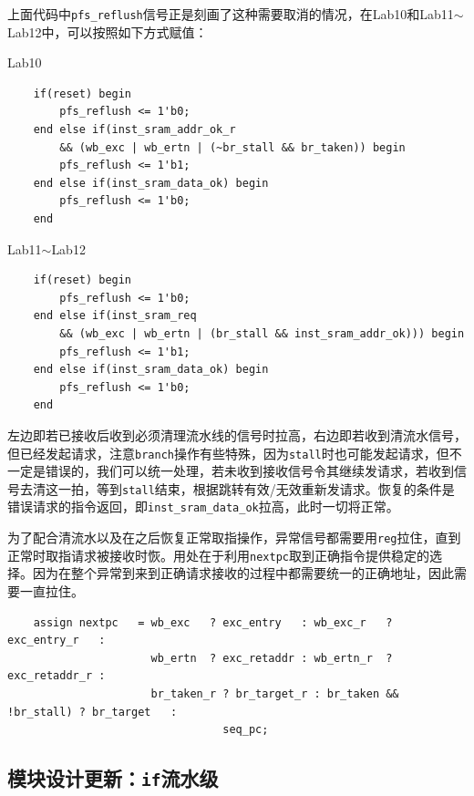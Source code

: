 \documentclass[UTF-8,twoside,c5size]{ctexart}
\begin{document}
	上面代码中\texttt{pfs_reflush}信号正是刻画了这种需要取消的情况，在Lab10和Lab11$\sim$Lab12中，可以按照如下方式赋值：
	    
    \begin{multicols}{2}
    Lab10
    \begin{verbatim}
    if(reset) begin
        pfs_reflush <= 1'b0;
    end else if(inst_sram_addr_ok_r
        && (wb_exc | wb_ertn | (~br_stall && br_taken)) begin
        pfs_reflush <= 1'b1;
    end else if(inst_sram_data_ok) begin
        pfs_reflush <= 1'b0;
    end
    \end{verbatim}
        
    \hfill
    
    Lab11$\sim$Lab12
    \begin{verbatim}
    if(reset) begin
        pfs_reflush <= 1'b0;
    end else if(inst_sram_req
        && (wb_exc | wb_ertn | (br_stall && inst_sram_addr_ok))) begin
        pfs_reflush <= 1'b1;
    end else if(inst_sram_data_ok) begin
        pfs_reflush <= 1'b0;    
    end
    \end{verbatim}
    
    \hfill
    
    \end{multicols}
	
	左边即若已接收后收到必须清理流水线的信号时拉高，右边即若收到清流水信号，但已经发起请求，注意\texttt{branch}操作有些特殊，因为\texttt{stall}时也可能发起请求，但不一定是错误的，我们可以统一处理，若未收到接收信号令其继续发请求，若收到信号去清这一拍，等到\texttt{stall}结束，根据跳转有效/无效重新发请求。恢复的条件是错误请求的指令返回，即\texttt{inst_sram_data_ok}拉高，此时一切将正常。
	
	为了配合清流水以及在之后恢复正常取指操作，异常信号都需要用\texttt{reg}拉住，直到正常时取指请求被接收时恢。用处在于利用\texttt{nextpc}取到正确指令提供稳定的选择。因为在整个异常到来到正确请求接收的过程中都需要统一的正确地址，因此需要一直拉住。
	
    \begin{verbatim}
    assign nextpc   = wb_exc   ? exc_entry   : wb_exc_r   ? exc_entry_r   :
                      wb_ertn  ? exc_retaddr : wb_ertn_r  ? exc_retaddr_r :
                      br_taken_r ? br_target_r : br_taken && !br_stall) ? br_target   :
                                 seq_pc;
    \end{verbatim}
	
	\subsection{模块设计更新：\texttt{if}流水级}
	
\end{document}

